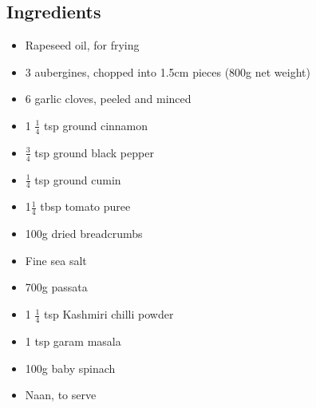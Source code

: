 \documentclass{book}
\begin{document}
\subsection*{Ingredients}
\begin{itemize}
\item Rapeseed oil, for frying
\item 3 aubergines, chopped into 1.5cm pieces (800g net weight)
\item 6 garlic cloves, peeled and minced
\item 1 $\frac{1}{4}$ tsp ground cinnamon
\item $\frac{3}{4}$ tsp ground black pepper
\item $\frac{1}{4}$ tsp ground cumin
\item 1$\frac{1}{4}$ tbsp tomato puree
\item 100g dried breadcrumbs
\item Fine sea salt
\item 700g passata
\item 1 $\frac{1}{4}$ tsp Kashmiri chilli powder
\item 1 tsp garam masala
\item 100g baby spinach
\item Naan, to serve
\end{itemize}
\end{document}

